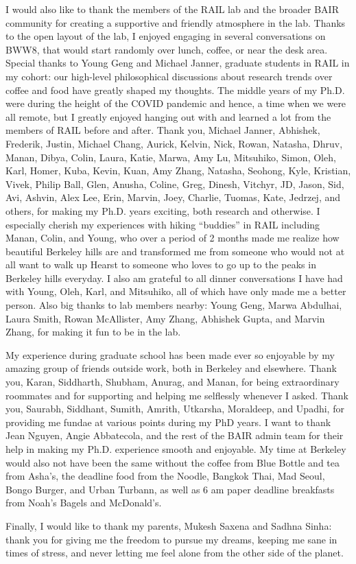 I would also like to thank the members of the RAIL lab and the broader BAIR community for creating a supportive and friendly atmosphere in the lab. Thanks to the open layout of the lab, I enjoyed engaging in several conversations on BWW8, that would start randomly over lunch, coffee, or near the desk area. Special thanks to Young Geng and Michael Janner, graduate students in RAIL in my cohort: our high-level philosophical discussions about research trends over coffee and food have greatly shaped my thoughts. The middle years of my Ph.D. were during the height of the COVID pandemic and hence, a time when we were all remote, but I greatly enjoyed hanging out with and learned a lot from the members of RAIL before and after. Thank you, Michael Janner, Abhishek, Frederik, Justin, Michael Chang, Aurick, Kelvin, Nick, Rowan, Natasha, Dhruv, Manan, Dibya, Colin, Laura, Katie, Marwa, Amy Lu, Mitsuhiko, Simon, Oleh, Karl, Homer, Kuba, Kevin, Kuan, Amy Zhang, Natasha, Seohong, Kyle, Kristian, Vivek, Philip Ball, Glen, Anusha, Coline, Greg, Dinesh, Vitchyr, JD, Jason, Sid, Avi, Ashvin, Alex Lee, Erin, Marvin, Joey, Charlie, Tuomas, Kate, Jedrzej, and others, for making my Ph.D. years exciting, both research and otherwise. I especially cherish my experiences with hiking ``buddies'' in RAIL including Manan, Colin, and Young, who over a period of 2 months made me realize how beautiful Berkeley hills are and transformed me from someone who would not at all want to walk up Hearst to someone who loves to go up to the peaks in Berkeley hills everyday. I also am grateful to all dinner conversations I have had with Young, Oleh, Karl, and Mitsuhiko, all of which have only made me a better person. Also big thanks to lab members nearby: Young Geng, Marwa Abdulhai, Laura Smith, Rowan McAllister, Amy Zhang, Abhishek Gupta, and Marvin Zhang, for making it fun to be in the lab.

My experience during graduate school has been made ever so enjoyable by my amazing group of friends outside work, both in Berkeley and elsewhere. Thank you, Karan, Siddharth, Shubham, Anurag, and Manan, for being extraordinary roommates and for supporting and helping me selflessly whenever I asked. Thank you, Saurabh, Siddhant, Sumith, Amrith, Utkarsha, Moraldeep, and Upadhi, for providing me fundae at various points during my PhD years. I want to thank Jean Nguyen, Angie Abbatecola, and the rest of the BAIR admin team for their help in making my Ph.D. experience smooth and enjoyable. My time at Berkeley would also not have been the same without the coffee from Blue Bottle and tea from Asha's, the deadline food from the Noodle, Bangkok Thai, Mad Seoul, Bongo Burger, and Urban Turbann, as well as 6 am paper deadline breakfasts from Noah's Bagels and McDonald's.

Finally, I would like to thank my parents, Mukesh Saxena and Sadhna Sinha: thank you for giving me the freedom to pursue my dreams, keeping me sane in times of stress, and never letting me feel alone from the other side of the planet.